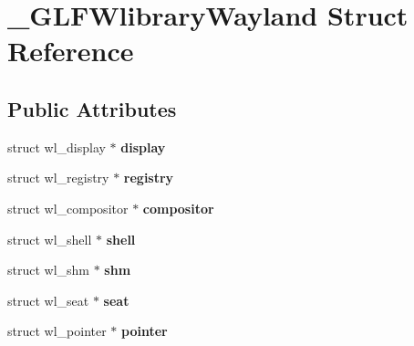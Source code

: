 \hypertarget{struct__GLFWlibraryWayland}{}\section{\+\_\+\+G\+L\+F\+Wlibrary\+Wayland Struct Reference}
\label{struct__GLFWlibraryWayland}
\subsection*{Public Attributes}
\begin{DoxyCompactItemize}
\item 
\hypertarget{struct__GLFWlibraryWayland_aab4897d208fc385b88f79fb2b270dc87}{}struct wl\+\_\+display $\ast$ {\bfseries display}\label{struct__GLFWlibraryWayland_aab4897d208fc385b88f79fb2b270dc87}

\item 
\hypertarget{struct__GLFWlibraryWayland_af6db7990e9aba4a8e8181d7af47e1e04}{}struct wl\+\_\+registry $\ast$ {\bfseries registry}\label{struct__GLFWlibraryWayland_af6db7990e9aba4a8e8181d7af47e1e04}

\item 
\hypertarget{struct__GLFWlibraryWayland_af4994494133067735cb44dd6d12e3685}{}struct wl\+\_\+compositor $\ast$ {\bfseries compositor}\label{struct__GLFWlibraryWayland_af4994494133067735cb44dd6d12e3685}

\item 
\hypertarget{struct__GLFWlibraryWayland_a858438e91cdcb083301be689d731a472}{}struct wl\+\_\+shell $\ast$ {\bfseries shell}\label{struct__GLFWlibraryWayland_a858438e91cdcb083301be689d731a472}

\item 
\hypertarget{struct__GLFWlibraryWayland_a0e04e8537088a81cc7dca0f8e425a643}{}struct wl\+\_\+shm $\ast$ {\bfseries shm}\label{struct__GLFWlibraryWayland_a0e04e8537088a81cc7dca0f8e425a643}

\item 
\hypertarget{struct__GLFWlibraryWayland_a87a3ec167f64c5ceba6af43d88d60609}{}struct wl\+\_\+seat $\ast$ {\bfseries seat}\label{struct__GLFWlibraryWayland_a87a3ec167f64c5ceba6af43d88d60609}

\item 
\hypertarget{struct__GLFWlibraryWayland_a0a8a79e530c7c8c372fd2969ace8548b}{}struct wl\+\_\+pointer $\ast$ {\bfseries pointer}\label{struct__GLFWlibraryWayland_a0a8a79e530c7c8c372fd2969ace8548b}


\end{DoxyCompactItemize}
